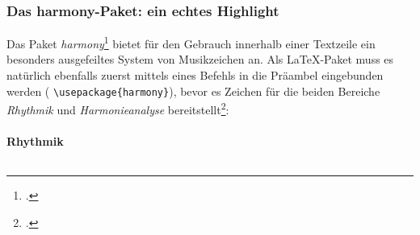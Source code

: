 %
%
%




\subsubsection{Das harmony-Paket: ein echtes Highlight}

Das Paket \textit{harmony}\footcite[vgl.][\nopage wp]{CtanHarmony2018a} bietet für
den Gebrauch innerhalb einer Textzeile ein besonders ausgefeiltes System von
Musikzeichen an. Als \LaTeX-Paket muss es natürlich ebenfalls zuerst mittels
eines Befehls in die Präambel eingebunden werden (\small 
\texttt{\textbackslash{usepackage\{harmony\}}}), bevor es Zeichen für die beiden
Bereiche \textit{Rhythmik} und \textit{Harmonieanalyse} bereitstellt\footcite[Für
einen vollen Überblick über den Zeichenvorrat und die Kombinationsmöglichkeiten
vgl.][4ff]{WegWeg2007a}:

\paragraph{\small Rhythmik}$\;$ \\

